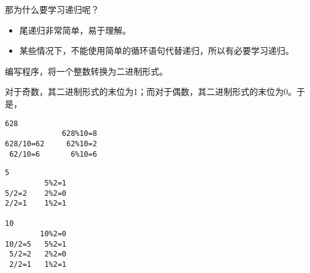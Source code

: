 \begin{frame}[fragile]
{\Large 那为什么要学习递归呢？}\pause 
\vspace{0.1in}

\begin{itemize}
\item 尾递归非常简单，易于理解。\\[0.1in]
\item 某些情况下，不能使用简单的循环语句代替递归，所以有必要学习递归。
\end{itemize}

\end{frame}

\begin{frame}[fragile]
编写程序，将一个整数转换为二进制形式。
\end{frame}

\begin{frame}[fragile]
对于奇数，其二进制形式的末位为1；而对于偶数，其二进制形式的末位为0。于是， 
\end{frame}

\begin{frame}[fragile]
\begin{lstlisting}[backgroundcolor=\color{red!10}]
628
             628%10=8  
628/10=62     62%10=2   
 62/10=6       6%10=6
\end{lstlisting}

\begin{lstlisting}[backgroundcolor=\color{red!10}]
5  
         5%2=1  
5/2=2    2%2=0  
2/2=1    1%2=1

10
        10%2=0  
10/2=5   5%2=1  
 5/2=2   2%2=0  
 2/2=1   1%2=1
\end{lstlisting}

\end{frame}



